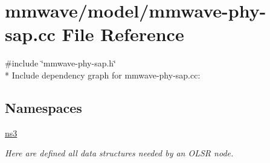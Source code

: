 \hypertarget{mmwave-phy-sap_8cc}{}\section{mmwave/model/mmwave-\/phy-\/sap.cc File Reference}
\label{mmwave-phy-sap_8cc}
{\ttfamily \#include \char`\"{}mmwave-\/phy-\/sap.\+h\char`\"{}}\\*
Include dependency graph for mmwave-\/phy-\/sap.cc\+:
\subsection*{Namespaces}
\begin{DoxyCompactItemize}
\item 
 \hyperlink{namespacens3}{ns3}
\begin{DoxyCompactList}\small\item\em Here are defined all data structures needed by an O\+L\+SR node. \end{DoxyCompactList}\end{DoxyCompactItemize}
